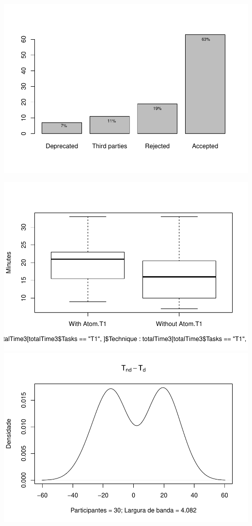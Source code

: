 \documentclass[]{article}
\begin{document}
\includegraphics{main_files/figure-latex/unnamed-chunk-12-1.pdf}

\includegraphics{main_files/figure-latex/unnamed-chunk-13-1.pdf}
\includegraphics{main_files/figure-latex/unnamed-chunk-14-1.pdf}
\end{document}
